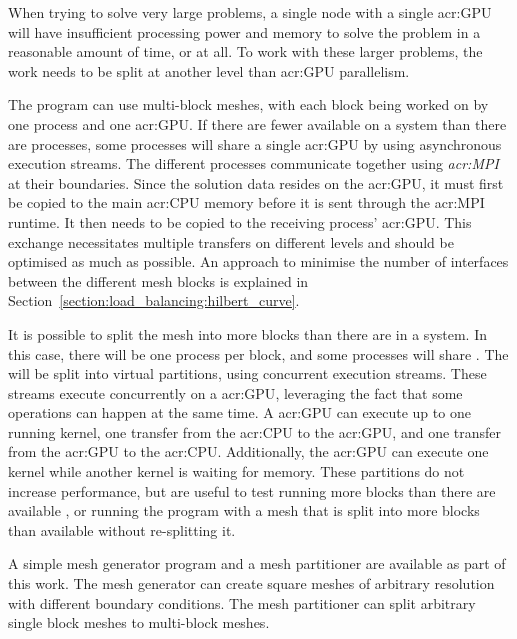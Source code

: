 When trying to solve very large problems, a single node with a single \acrshort{acr:GPU} will have
insufficient processing power and memory to solve the problem in a reasonable amount of time, or at
all. To work with these larger problems, the work needs to be split at another level than
\acrshort{acr:GPU} parallelism.  

The program can use multi-block meshes, with each block being worked on by one process and one
\acrshort{acr:GPU}. If there are fewer  available on a system than there are
processes, some processes will share a single \acrshort{acr:GPU} by using asynchronous execution
streams. The different processes communicate together using \textit{\acrfull{acr:MPI}} at their
boundaries. Since the solution data resides on the \acrshort{acr:GPU}, it must first be copied to
the main \acrshort{acr:CPU} memory before it is sent through the \acrshort{acr:MPI} runtime. It then
needs to be copied to the receiving process' \acrshort{acr:GPU}. This exchange necessitates multiple
transfers on different levels and should be optimised as much as possible. An approach to minimise
the number of interfaces between the different mesh blocks is explained in
Section~\ref{section:load_balancing:hilbert_curve}. 

It is possible to split the mesh into more blocks than there are  in a system.
In this case, there will be one process per block, and some processes will share
. The  will be split into virtual partitions, using
concurrent execution streams. These streams execute concurrently on a \acrshort{acr:GPU}, leveraging
the fact that some operations can happen at the same time. A \acrshort{acr:GPU} can execute up to
one running kernel, one transfer from the \acrshort{acr:CPU} to the \acrshort{acr:GPU}, and one
transfer from the \acrshort{acr:GPU} to the \acrshort{acr:CPU}. Additionally, the \acrshort{acr:GPU}
can execute one kernel while another kernel is waiting for memory. These partitions do not increase
performance, but are useful to test running more blocks than there are available
, or running the program with a mesh that is split into more blocks than
available  without re-splitting it.

A simple mesh generator program and a mesh partitioner are available as part of this work. The mesh
generator can create square meshes of arbitrary resolution with different boundary conditions. The
mesh partitioner can split arbitrary single block meshes to multi-block meshes.

